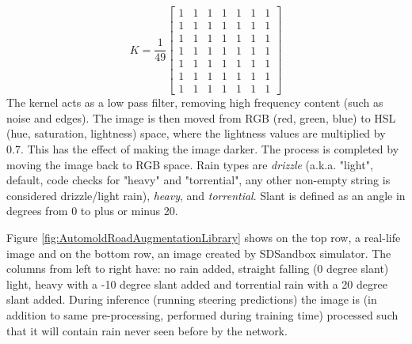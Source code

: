 \begin{equation}
\label{eq:blurring-kernel}
    K = \frac{1}{49} \begin{bmatrix} 1 & 1 & 1 & 1 & 1 & 1 & 1 \\ 
    1 & 1 & 1 & 1 & 1 & 1 & 1 \\ 
    1 & 1 & 1 & 1 & 1 & 1 & 1 \\ 
    1 & 1 & 1 & 1 & 1 & 1 & 1 \\ 
    1 & 1 & 1 & 1 & 1 & 1 & 1 \\ 
    1 & 1 & 1 & 1 & 1 & 1 & 1 \\ 
    1 & 1 & 1 & 1 & 1 & 1 & 1 \end{bmatrix}
\end{equation}
The kernel acts as a low pass filter, removing high frequency content (such as noise and edges). The image is then moved from RGB (red, green, blue) to HSL (hue, saturation, lightness) space, where the lightness values are multiplied by 0.7. This has the effect of making the image darker. The process is completed by moving the image back to RGB space. Rain types are \textit{drizzle} (a.k.a. "light", default, code checks for "heavy" and "torrential", any other non-empty string is considered drizzle/light rain), \textit{heavy}, and \textit{torrential}. Slant is defined as an angle in degrees from 0 to plus or minus 20.


Figure \ref{fig:AutomoldRoadAugmentationLibrary} shows on the top row, a real-life image and on the bottom row, an image created by SDSandbox simulator. The columns from left to right have: no rain added, straight falling (0 degree slant) light, heavy with a -10 degree slant added and torrential rain with a 20 degree slant added.  
During inference (running steering predictions) the image is (in addition to same pre-processing, performed during training time) processed such that it will contain rain never seen before by the network. 

